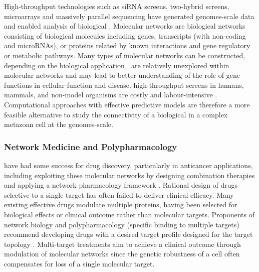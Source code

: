 High-throughput technologies such as \gls{siRNA} screens, two-hybrid screens, \glspl{microarray} and massively parallel sequencing have generated \glspl{genome}-scale data and enabled analysis of biological  \citep{Barabasi2004, Boone2007, Goodwin2016}. 
Molecular networks are biological networks consisting of biological molecules including genes, transcripts (with non-coding and \glspl{microRNA}), or proteins related by known interactions and gene regulatory or metabolic \glspl{pathway}. 
Many types of molecular networks can be constructed, depending on the biological application \citep{}.  are relatively unexplored within molecular networks and may lead to better understanding of the role of gene functions in cellular function and disease. %
\Glspl{high-throughput screen} in humans, mammals, and non-model organisms are costly and labour-intensive \citep{Fece2015}. Computational approaches with effective predictive models are therefore a more feasible alternative to study the connectivity of a biological  in a complex metazoan cell at the \glspl{genome}-scale.

\iffalse
\subsubsection{Network Medicine and Polypharmacology}
 have had some success for drug discovery, particularly in anticancer applications, including exploiting these molecular networks by designing combination therapies and applying a network pharmacology framework \citep{Hopkins2008}. Rational design of drugs selective to a single target has often failed to deliver clinical efficacy. Many existing effective drugs modulate multiple proteins, having been selected for biological effects or clinical outcome rather than molecular targets. Proponents of network biology and \gls{polypharmacology} (specific binding to multiple targets) recommend developing drugs with a desired target profile designed for the target topology \citep{Hopkins2008, Barabasi2004}. Multi-target \glspl{treatment} aim to achieve a clinical outcome through modulation of molecular networks since the \gls{genetic robustness} of a cell often compensates for loss of a single molecular target.  

